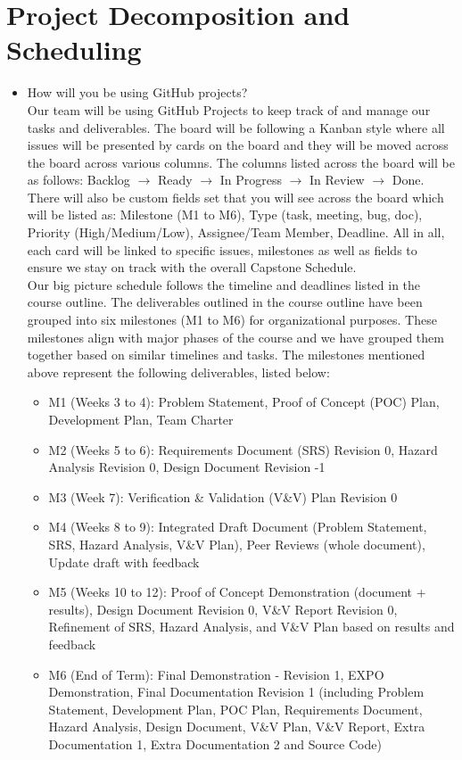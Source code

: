 \documentclass{article}
\begin{document}
\section{Project Decomposition and Scheduling}


\begin{itemize}
 \item How will you be using GitHub projects? \\
Our team will be using GitHub Projects to keep track of and manage our tasks and deliverables. The board will be following a
Kanban style where all issues will be presented by cards on the board and they will be moved across the board across various
columns. The columns listed across the board will be as follows: Backlog $\rightarrow$ Ready $\rightarrow$ In Progress $\rightarrow$
In Review $\rightarrow$ Done. There will
also be custom fields set that you will see across the board which will be listed as: Milestone (M1 to M6), Type (task, meeting,
bug, doc), Priority (High/Medium/Low), Assignee/Team Member, Deadline. All in all, each card will be linked to specific issues,
milestones as well as fields to ensure we stay on track with the overall Capstone Schedule. \\


Our big picture schedule follows the timeline and deadlines listed in the course outline. The deliverables outlined in the course
outline have been grouped into six milestones (M1 to M6) for organizational purposes. These milestones align with major phases of the
course and we have grouped them together based on similar timelines and tasks. The milestones mentioned above represent the
following deliverables, listed below:


 \begin{itemize}
   \item M1 (Weeks 3 to 4): Problem Statement, Proof of Concept (POC) Plan, Development Plan, Team Charter
   \item M2 (Weeks 5 to 6): Requirements Document (SRS) Revision 0, Hazard Analysis Revision 0, Design Document Revision -1
   \item M3 (Week 7): Verification \& Validation (V\&V) Plan Revision 0
   \item M4 (Weeks 8 to 9): Integrated Draft Document (Problem Statement, SRS, Hazard Analysis, V\&V Plan), Peer Reviews (whole document), Update draft with feedback
   \item M5 (Weeks 10 to 12): Proof of Concept Demonstration (document + results), Design Document Revision 0, V\&V Report Revision 0, Refinement of SRS, Hazard Analysis, and V\&V Plan based on results and feedback
   \item M6 (End of Term): Final Demonstration - Revision 1, EXPO Demonstration, Final Documentation Revision 1 (including Problem Statement, Development Plan, POC Plan, Requirements Document, Hazard Analysis, Design Document, V\&V Plan, V\&V Report, Extra Documentation 1, Extra Documentation 2 and Source Code)
 \end{itemize}





\end{itemize}
\end{document}
